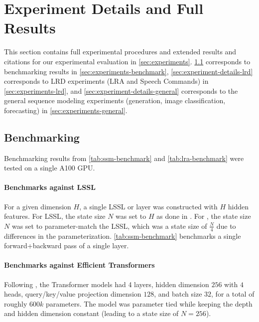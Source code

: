 
\section{Experiment Details and Full Results}
\label{sec:experiment-details}

This section contains full experimental procedures and extended results and citations for our experimental evaluation in \cref{sec:experiments}.
\cref{sec:experiment-details-benchmarking} corresponds to benchmarking results in \cref{sec:experiments-benchmark},
\cref{sec:experiment-details-lrd} corresponds to LRD experiments (LRA and Speech Commands) in \cref{sec:experiments-lrd},
and \cref{sec:experiment-details-general} corresponds to the general sequence modeling experiments (generation, image classification, forecasting) in \cref{sec:experiments-general}.

\subsection{Benchmarking}
\label{sec:experiment-details-benchmarking}

Benchmarking results from \cref{tab:ssm-benchmark} and \cref{tab:lra-benchmark} were tested on a single A100 GPU.

\paragraph{Benchmarks against LSSL}

For a given dimension \( H \), a single LSSL or \methodabbrv{} layer was constructed with \( H \) hidden features.
For LSSL, the state size \( N \) was set to \( H \) as done in \citep{gu2021lssl}.
For \methodabbrv{}, the state size \( N \) was set to parameter-match the LSSL, which was a state size of \( \frac{N}{4} \) due to differences in the parameterization.
\cref{tab:ssm-benchmark} benchmarks a single forward+backward pass of a single layer.

\paragraph{Benchmarks against Efficient Transformers}
Following \citep{tay2021long}, the Transformer models had 4 layers, hidden dimension \( 256 \) with \( 4 \) heads, query/key/value projection dimension \( 128 \), and batch size \( 32 \), for a total of roughly \( 600k \) parameters.
The \methodabbrv{} model was parameter tied while keeping the depth and hidden dimension constant (leading to a state size of \( N = 256 \)).

